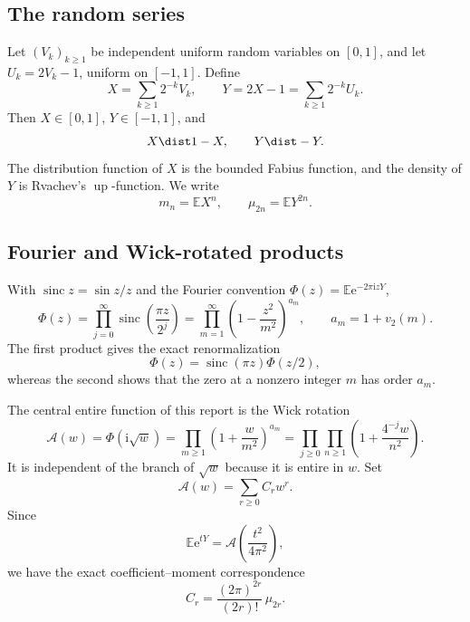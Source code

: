 \documentclass[11pt]{article}
\numberwithin{equation}{section}
\theoremstyle{definition}
\theoremstyle{remark}
\newcommand{\E}{\mathbb E}
\newcommand{\Up}{\operatorname{up}}
\newcommand{\sinc}{\operatorname{sinc}}
\newcommand{\e}{\mathrm e}
\newcommand{\ii}{\mathrm i}
\begin{document}
\subsection{The random series}

Let $(V_k)_{k\ge1}$ be independent uniform random variables on $[0,1]$, and let
$U_k=2V_k-1$, uniform on $[-1,1]$.  Define
\begin{equation}\label{p5:eq:X-Y-def}
 X=\sum_{k\ge1}2^{-k}V_k,\qquad
 Y=2X-1=\sum_{k\ge1}2^{-k}U_k.
\end{equation}
Then $X\in[0,1]$, $Y\in[-1,1]$, and
\begin{equation}\label{p5:eq:symmetry}
 X\dist1-X,\qquad Y\dist-Y.
\end{equation}
The distribution function of $X$ is the bounded Fabius function, and the density
of $Y$ is Rvachev's $\Up$-function.  We write
\begin{equation}\label{p5:eq:moments-def}
 m_n=\E X^n,\qquad \mu_{2n}=\E Y^{2n}.
\end{equation}

\subsection{Fourier and Wick-rotated products}

With $\sinc z=\sin z/z$ and the Fourier convention
$\Phi(z)=\E\e^{-2\pi\ii zY}$,
\begin{equation}\label{p5:eq:Phi-products}
 \Phi(z)=\prod_{j=0}^{\infty}\sinc\!\left(\frac{\pi z}{2^j}\right)
 =\prod_{m=1}^{\infty}\left(1-\frac{z^2}{m^2}\right)^{a_m},
 \qquad a_m=1+v_2(m).
\end{equation}
The first product gives the exact renormalization
\begin{equation}\label{p5:eq:Phi-renorm}
 \Phi(z)=\sinc(\pi z)\Phi(z/2),
\end{equation}
whereas the second shows that the zero at a nonzero integer $m$ has order
$a_m$.

The central entire function of this report is the Wick rotation
\begin{equation}\label{p5:eq:A-def}
 \mathcal A(w)=\Phi(\ii\sqrt w)
 =\prod_{m\ge1}\left(1+\frac{w}{m^2}\right)^{a_m}
 =\prod_{j\ge0}\prod_{n\ge1}\left(1+\frac{4^{-j}w}{n^2}\right).
\end{equation}
It is independent of the branch of $\sqrt w$ because it is entire in $w$.
Set
\begin{equation}\label{p5:eq:C-def}
 \mathcal A(w)=\sum_{r\ge0}C_rw^r.
\end{equation}
Since
\begin{equation}\label{p5:eq:mgf-A}
 \E\e^{tY}=\mathcal A\!\left(\frac{t^2}{4\pi^2}\right),
\end{equation}
we have the exact coefficient--moment correspondence
\begin{equation}\label{p5:eq:C-moment}
 C_r=\frac{(2\pi)^{2r}}{(2r)!}\,\mu_{2r}.
\end{equation}
\end{document}
